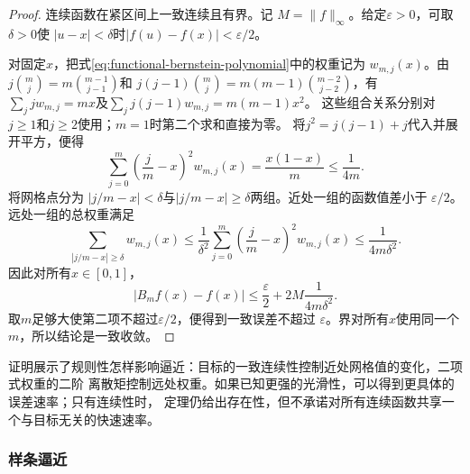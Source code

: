 \begin{proof}
连续函数在紧区间上一致连续且有界。记
$M=\lVert f\rVert_{\infty}$。给定$\varepsilon>0$，可取$\delta>0$使
$|u-x|<\delta$时$|f(u)-f(x)|<\varepsilon/2$。

对固定$x$，把式\eqref{eq:functional-bernstein-polynomial}中的权重记为
$w_{m,j}(x)$。由$j\binom mj=m\binom{m-1}{j-1}$和
$j(j-1)\binom mj=m(m-1)\binom{m-2}{j-2}$，有
$\sum_jj w_{m,j}=mx$及$\sum_jj(j-1)w_{m,j}=m(m-1)x^2$。
这些组合关系分别对$j\geq1$和$j\geq2$使用；$m=1$时第二个求和直接为零。
将$j^2=j(j-1)+j$代入并展开平方，便得
\[
  \sum_{j=0}^{m}
  \left(\frac{j}{m}-x\right)^2w_{m,j}(x)
  =
  \frac{x(1-x)}{m}
  \leq\frac{1}{4m}.
\]
将网格点分为
$|j/m-x|<\delta$与$|j/m-x|\geq\delta$两组。近处一组的函数值差小于
$\varepsilon/2$。远处一组的总权重满足
\[
  \sum_{|j/m-x|\geq\delta}w_{m,j}(x)
  \leq
  \frac{1}{\delta^2}
  \sum_{j=0}^{m}
  \left(\frac{j}{m}-x\right)^2w_{m,j}(x)
  \leq\frac{1}{4m\delta^2}.
\]
因此对所有$x\in[0,1]$，
\[
  |B_mf(x)-f(x)|
  \leq
  \frac{\varepsilon}{2}
  +
  2M\frac{1}{4m\delta^2}.
\]
取$m$足够大使第二项不超过$\varepsilon/2$，便得到一致误差不超过
$\varepsilon$。界对所有$x$使用同一个$m$，所以结论是一致收敛。
\end{proof}

证明展示了规则性怎样影响逼近：目标的一致连续性控制近处网格值的变化，二项式权重的二阶
离散矩控制远处权重。如果已知更强的光滑性，可以得到更具体的误差速率；只有连续性时，
定理仍给出存在性，但不承诺对所有连续函数共享一个与目标无关的快速速率。

\subsubsection{样条逼近}

